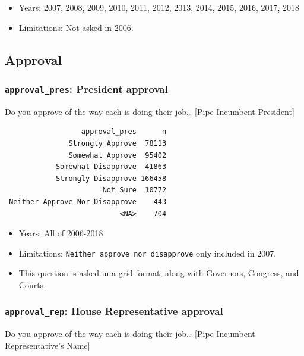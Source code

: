 \documentclass[10pt,article,oneside]{memoir}
\theoremstyle{definition}
\begin{document}
\begin{itemize}
\tightlist
\item
  Years: 2007, 2008, 2009, 2010, 2011, 2012, 2013, 2014, 2015, 2016,
  2017, 2018
\item
  Limitations: Not asked in 2006.
\end{itemize}

\hypertarget{approval}{%
\subsection{Approval}\label{approval}}

\hypertarget{approval_pres-president-approval}{%
\subsubsection{\texorpdfstring{\texttt{approval\_pres}: President
approval}{approval\_pres: President approval}}\label{approval_pres-president-approval}}

Do you approve of the way each is doing their job\ldots{} {[}Pipe
Incumbent President{]}

\begin{verbatim}
                  approval_pres      n
               Strongly Approve  78113
               Somewhat Approve  95402
            Somewhat Disapprove  41863
            Strongly Disapprove 166458
                       Not Sure  10772
 Neither Approve Nor Disapprove    443
                           <NA>    704
\end{verbatim}

\begin{itemize}
\tightlist
\item
  Years: All of 2006-2018
\item
  Limitations: \texttt{Neither\ approve\ nor\ disapprove} only included
  in 2007.
\item
  This question is asked in a grid format, along with Governors,
  Congress, and Courts.
\end{itemize}

\hypertarget{approval_rep-house-representative-approval}{%
\subsubsection{\texorpdfstring{\texttt{approval\_rep}: House
Representative
approval}{approval\_rep: House Representative approval}}\label{approval_rep-house-representative-approval}}

Do you approve of the way each is doing their job\ldots{} {[}Pipe
Incumbent Representative's Name{]}
\end{document}

